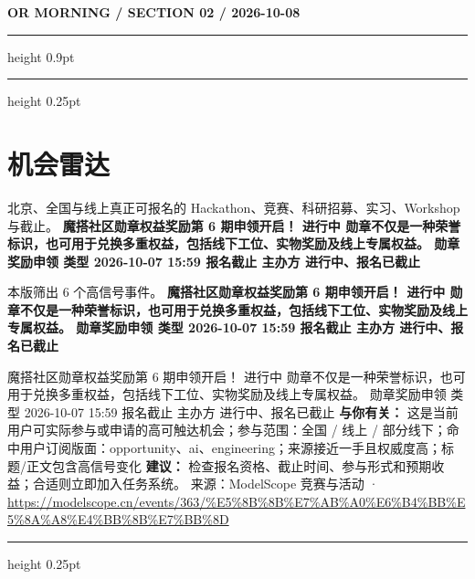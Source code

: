 \documentclass[10.5pt]{ctexart}
\begin{document}
\newpage
{\small\bfseries OR MORNING / SECTION 02 / 2026-10-08}
\vspace{2mm}
\hrule height 0.9pt
\vspace{1.5mm}
\hrule height 0.25pt
\vspace{4mm}
\section*{机会雷达}
{\color{ormuted} 北京、全国与线上真正可报名的 Hackathon、竞赛、科研招募、实习、Workshop 与截止。}
\vspace{2mm}
{\LARGE\bfseries 魔搭社区勋章权益奖励第 6 期申领开启！ 进行中 勋章不仅是一种荣誉标识，也可用于兑换多重权益，包括线下工位、实物奖励及线上专属权益。 勋章奖励申领 类型 2026-10-07 15:59 报名截止 主办方 进行中、报名已截止}\par
\vspace{1mm}
{\color{ormuted} 本版筛出 6 个高信号事件。}
\vspace{3mm}
{\Large\bfseries 魔搭社区勋章权益奖励第 6 期申领开启！ 进行中 勋章不仅是一种荣誉标识，也可用于兑换多重权益，包括线下工位、实物奖励及线上专属权益。 勋章奖励申领 类型 2026-10-07 15:59 报名截止 主办方 进行中、报名已截止}\par
魔搭社区勋章权益奖励第 6 期申领开启！ 进行中 勋章不仅是一种荣誉标识，也可用于兑换多重权益，包括线下工位、实物奖励及线上专属权益。 勋章奖励申领 类型 2026-10-07 15:59 报名截止 主办方 进行中、报名已截止
\textbf{与你有关：} 这是当前用户可实际参与或申请的高可触达机会；参与范围：全国 / 线上 / 部分线下；命中用户订阅版面：opportunity、ai、engineering；来源接近一手且权威度高；标题/正文包含高信号变化
\textbf{建议：} 检查报名资格、截止时间、参与形式和预期收益；合适则立即加入任务系统。
{\footnotesize\color{ormuted} 来源：ModelScope 竞赛与活动 · \url{https://modelscope.cn/events/363/%E5%8B%8B%E7%AB%A0%E6%B4%BB%E5%8A%A8%E4%BB%8B%E7%BB%8D}}
\vspace{4mm}
\hrule height 0.25pt
\vspace{3mm}
\end{document}
